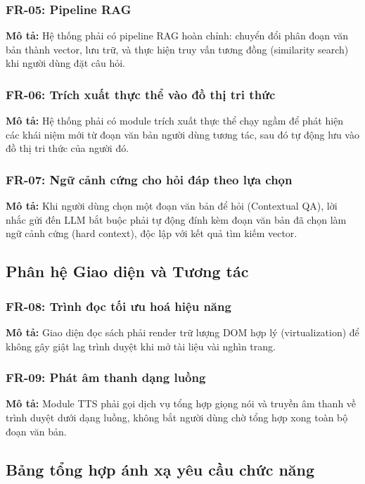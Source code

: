\subsubsection{FR-05: Pipeline RAG}
\textbf{Mô tả:} Hệ thống phải có pipeline RAG hoàn chỉnh: chuyển đổi phân đoạn văn bản thành vector, lưu trữ, và thực hiện truy vấn tương đồng (similarity search) khi người dùng đặt câu hỏi.

\subsubsection{FR-06: Trích xuất thực thể vào đồ thị tri thức}
\textbf{Mô tả:} Hệ thống phải có module trích xuất thực thể chạy ngầm để phát hiện các khái niệm mới từ đoạn văn bản người dùng tương tác, sau đó tự động lưu vào đồ thị tri thức của người đó.

\subsubsection{FR-07: Ngữ cảnh cứng cho hỏi đáp theo lựa chọn}
\textbf{Mô tả:} Khi người dùng chọn một đoạn văn bản để hỏi (Contextual QA), lời nhắc gửi đến LLM bắt buộc phải tự động đính kèm đoạn văn bản đã chọn làm ngữ cảnh cứng (hard context), độc lập với kết quả tìm kiếm vector.

\subsection{Phân hệ Giao diện và Tương tác}
\subsubsection{FR-08: Trình đọc tối ưu hoá hiệu năng}
\textbf{Mô tả:} Giao diện đọc sách phải render trữ lượng DOM hợp lý (virtualization) để không gây giật lag trình duyệt khi mở tài liệu vài nghìn trang.

\subsubsection{FR-09: Phát âm thanh dạng luồng}
\textbf{Mô tả:} Module TTS phải gọi dịch vụ tổng hợp giọng nói và truyền âm thanh về trình duyệt dưới dạng luồng, không bắt người dùng chờ tổng hợp xong toàn bộ đoạn văn bản.

\subsection{Bảng tổng hợp ánh xạ yêu cầu chức năng}

